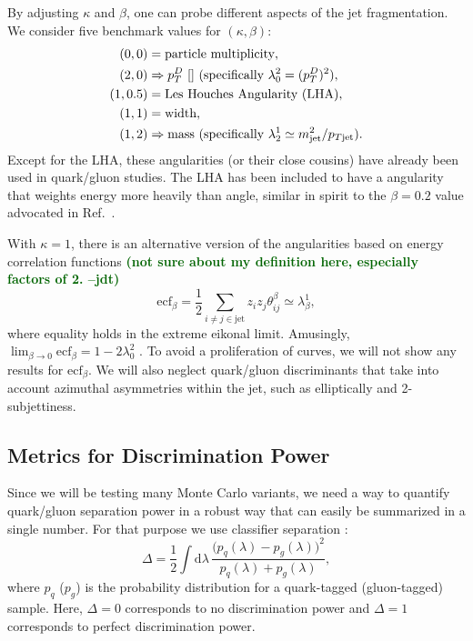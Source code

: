 \documentclass[11pt,letterpaper]{article}
\newcommand{\genang}[2]{{\lambda^{#1}_{#2}}}
\newcommand{\df}{\text{d}}
\DeclareRobustCommand{\Ref}[1]{Ref.~\cite{#1}}
\newcommand{\be}{\begin{equation}}
\newcommand{\ee}{\end{equation}}
\newcommand{\jdt}[1]{\textbf{\textcolor{darkgreen}{(#1 --jdt)}}}
\begin{document}
By adjusting $\kappa$ and $\beta$, one can probe different aspects of the jet fragmentation.  We consider five benchmark values for $(\kappa, \beta)$:
\begin{align}
(0,0) &= \text{particle multiplicity},\\
(2,0) &\Rightarrow p_T^D \text{  \cite{} (specifically $\genang{2}{0} = (p_T^D)^2$)},\\
(1,0.5) & = \text{Les Houches Angularity (LHA)},\\
(1,1) &= \text{width},\\
(1,2) & \Rightarrow \text{mass} \text{ (specifically $\genang{1}{2} \simeq m_{\rm jet}^2 / p_{T{\rm jet}}$)}.
\end{align}
Except for the LHA, these angularities (or their close cousins) have already been used in quark/gluon studies.  The LHA has been included to have a angularity that weights energy more heavily than angle, similar in spirit to the $\beta = 0.2$ value advocated in \Ref{}.

With $\kappa = 1$, there is an alternative version of the angularities based on energy correlation functions \jdt{not sure about my definition here, especially factors of 2.}
\be
\text{ecf}_\beta = \frac{1}{2}\sum_{i \not= j \in \text{jet}} z_i z_j \theta_{ij}^\beta \simeq \genang{1}{\beta},
\ee
where equality holds in the extreme eikonal limit.  Amusingly, $\lim_{\beta \to 0} \text{ecf}_\beta = 1 - 2 \genang{2}{0}$ \cite{}.  To avoid a proliferation of curves, we will not show any results for $\text{ecf}_\beta$.  We will also neglect quark/gluon discriminants that take into account azimuthal asymmetries within the jet, such as elliptically and 2-subjettiness.

\subsection{Metrics for Discrimination Power}

Since we will be testing many Monte Carlo variants, we need a way to quantify quark/gluon separation power in a robust way that can easily be summarized in a single number.  For that purpose we use classifier separation \cite{}:
\be
\Delta =  \frac{1}{2} \int \df \lambda \, \frac{\bigl(p_q(\lambda) - p_g(\lambda)\bigr)^2}{p_q(\lambda) + p_g(\lambda)},
\ee
where $p_q$ ($p_g$) is the probability distribution for a quark-tagged (gluon-tagged) sample.  Here, $\Delta = 0$ corresponds to no discrimination power and $\Delta = 1$ corresponds to perfect discrimination power.
\end{document}

